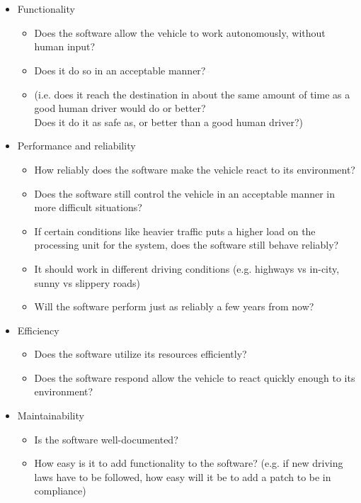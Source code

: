 \documentclass[letterpaper]{article}
\begin{document}
\section{}

\begin{itemize}
	\item Functionality

	      \begin{itemize}
		      \item Does the software allow the vehicle to work autonomously, without human input?
		      \item Does it do so in an acceptable manner?
		      \item (i.e. does it reach the destination in about the same amount of time as a good human driver would do or better?\\
		            Does it do it as safe as, or better than a good human driver?)
	      \end{itemize}
	\item Performance and reliability
	      \begin{itemize}
		      \item How reliably does the software make the vehicle react to its environment?
		      \item Does the software still control the vehicle in an acceptable manner in more difficult situations?
		      \item If certain conditions like heavier traffic puts a higher load on the processing unit for the system, does the software still behave reliably?
		      \item It should work in different driving conditions (e.g. highways vs in-city, sunny vs slippery roads)
		      \item Will the software perform just as reliably a few years from now?
	      \end{itemize}
	\item Efficiency
	      \begin{itemize}
		      \item Does the software utilize its resources efficiently?
		      \item Does the software respond allow the vehicle to react quickly enough to its environment?
	      \end{itemize}
	\item Maintainability
	      \begin{itemize}
		      \item Is the software well-documented?
		      \item How easy is it to add functionality to the software? (e.g. if new driving laws have to be followed, how easy will it be to add a patch to be in compliance)

\end{itemize}
\end{itemize}
\end{document}
